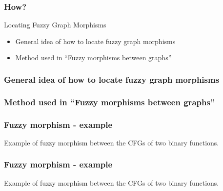 


\begin{frame}
	\frametitle{How?}

	\begin{block}{Locating Fuzzy Graph Morphisms}
		\begin{itemize}
			\item General idea of how to locate fuzzy graph morphisms
			\item Method used in ``Fuzzy morphisms between graphs''
		\end{itemize}
	\end{block}
\end{frame}


\begin{frame}
	\frametitle{General idea of how to locate fuzzy graph morphisms}


\end{frame}

\begin{frame}
	\frametitle{Method used in ``Fuzzy morphisms between graphs''}

\end{frame}



\begin{frame}
	\frametitle{Fuzzy morphism - example}
	Example of fuzzy morphism between the CFGs of two binary functions.

\end{frame}

\begin{frame}[noframenumbering]
	\frametitle{Fuzzy morphism - example}
	Example of fuzzy morphism between the CFGs of two binary functions.

\end{frame}
